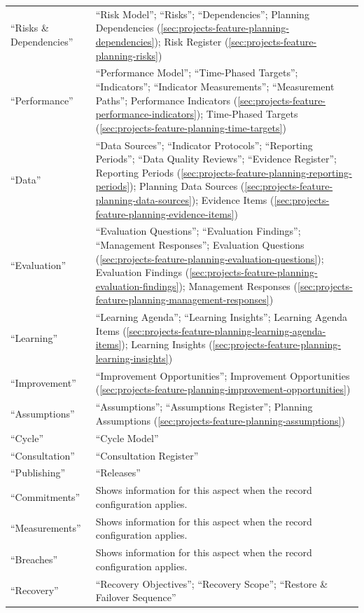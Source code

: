 \begin{table}[H]
\begin{tabularx}{\linewidth}{R{4.2cm} Y}
“Risks \& Dependencies” & “Risk Model”; “Risks”; “Dependencies”; Planning Dependencies (\ref{sec:projects-feature-planning-dependencies}); Risk Register (\ref{sec:projects-feature-planning-risks})\\
“Performance” & “Performance Model”; “Time-Phased Targets”; “Indicators”; “Indicator Measurements”; “Measurement Paths”; Performance Indicators (\ref{sec:projects-feature-performance-indicators}); Time-Phased Targets (\ref{sec:projects-feature-planning-time-targets})\\
“Data” & “Data Sources”; “Indicator Protocols”; “Reporting Periods”; “Data Quality Reviews”; “Evidence Register”; Reporting Periods (\ref{sec:projects-feature-planning-reporting-periods}); Planning Data Sources (\ref{sec:projects-feature-planning-data-sources}); Evidence Items (\ref{sec:projects-feature-planning-evidence-items})\\
“Evaluation” & “Evaluation Questions”; “Evaluation Findings”; “Management Responses”; Evaluation Questions (\ref{sec:projects-feature-planning-evaluation-questions}); Evaluation Findings (\ref{sec:projects-feature-planning-evaluation-findings}); Management Responses (\ref{sec:projects-feature-planning-management-responses})\\
“Learning” & “Learning Agenda”; “Learning Insights”; Learning Agenda Items (\ref{sec:projects-feature-planning-learning-agenda-items}); Learning Insights (\ref{sec:projects-feature-planning-learning-insights})\\
“Improvement” & “Improvement Opportunities”; Improvement Opportunities (\ref{sec:projects-feature-planning-improvement-opportunities})\\
“Assumptions” & “Assumptions”; “Assumptions Register”; Planning Assumptions (\ref{sec:projects-feature-planning-assumptions})\\
“Cycle” & “Cycle Model”\\
“Consultation” & “Consultation Register”\\
“Publishing” & “Releases”\\
“Commitments” & Shows information for this aspect when the record configuration applies.\\
“Measurements” & Shows information for this aspect when the record configuration applies.\\
“Breaches” & Shows information for this aspect when the record configuration applies.\\
“Recovery” & “Recovery Objectives”; “Recovery Scope”; “Restore \& Failover Sequence”\\

\end{tabularx}
\end{table}
